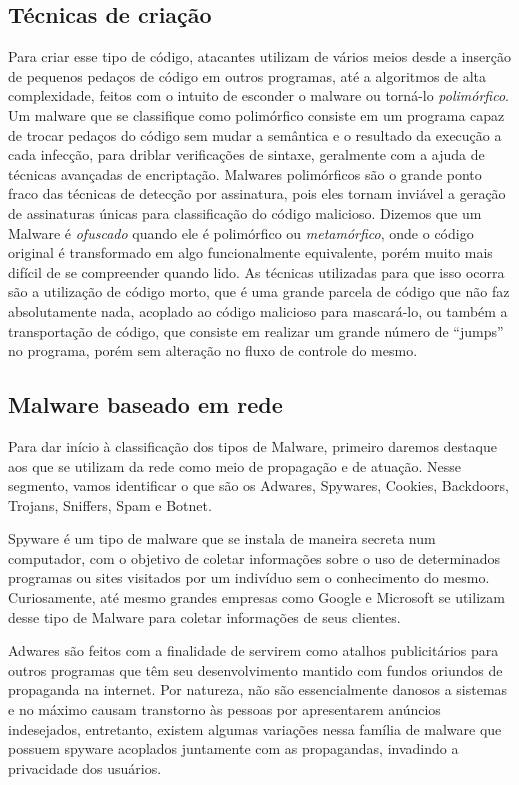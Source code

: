 \subsection{Técnicas de criação}
\label{ss.tecnicas}

Para criar esse tipo de código, atacantes utilizam de vários meios desde a
inserção de pequenos pedaços de código em outros programas, até a algoritmos
de alta complexidade, feitos com o intuito de esconder o malware ou torná-lo
\emph{polimórfico}. Um malware que se classifique como polimórfico consiste em
um programa capaz de trocar pedaços do código sem mudar a semântica e o
resultado da execução a cada infecção, para driblar verificações de sintaxe,
geralmente com a ajuda de técnicas avançadas de encriptação. Malwares
polimórficos são o grande ponto fraco das técnicas de detecção por assinatura,
pois eles tornam inviável a geração de assinaturas únicas para classificação
do código malicioso. Dizemos que um Malware é \emph{ofuscado} quando ele é
polimórfico ou \emph{metamórfico}, onde o código original é transformado em
algo funcionalmente equivalente, porém muito mais difícil de se compreender
quando lido. As técnicas utilizadas para que isso ocorra são a utilização de
código morto, que é uma grande parcela de código que não faz absolutamente
nada, acoplado ao código malicioso para mascará-lo, ou também a transportação
de código, que consiste em realizar um grande número de ``jumps'' no programa,
porém sem alteração no fluxo de controle do mesmo.

\subsection{Malware baseado em rede}
\label{ss.malware_rede}

Para dar início à classificação dos tipos de Malware, primeiro daremos
destaque aos que se utilizam da rede como meio de propagação e de atuação.
Nesse segmento, vamos identificar o que são os Adwares, Spywares, Cookies,
Backdoors, Trojans, Sniffers, Spam e Botnet.

Spyware é um tipo de malware que se instala de maneira secreta num computador,
com o objetivo de coletar informações sobre o uso de determinados programas ou
sites visitados por um indivíduo sem o conhecimento do mesmo. Curiosamente,
até mesmo grandes empresas como Google e Microsoft se utilizam desse tipo de
Malware para coletar informações de seus clientes.

Adwares são feitos com a finalidade de servirem como atalhos publicitários
para outros programas que têm seu desenvolvimento mantido com fundos oriundos
de propaganda na internet. Por natureza, não são essencialmente danosos a
sistemas e no máximo causam transtorno às pessoas por apresentarem anúncios
indesejados, entretanto, existem algumas variações nessa família de malware
que possuem spyware acoplados juntamente com as propagandas, invadindo a
privacidade dos usuários.

